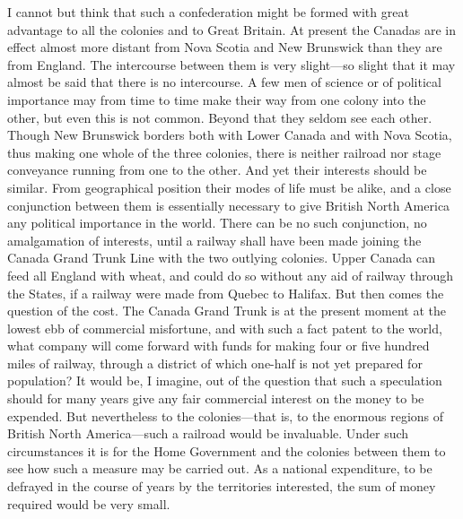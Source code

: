 I cannot but think that such a confederation might be formed with
great advantage to all the colonies and to Great Britain.  At
present the Canadas are in effect almost more distant from Nova
Scotia and New Brunswick than they are from England.  The
intercourse between them is very slight---so slight that it may
almost be said that there is no intercourse.  A few men of science
or of political importance may from time to time make their way
from one colony into the other, but even this is not common.
Beyond that they seldom see each other.  Though New Brunswick
borders both with Lower Canada and with Nova Scotia, thus making
one whole of the three colonies, there is neither railroad nor
stage conveyance running from one to the other.  And yet their
interests should be similar.  From geographical position their
modes of life must be alike, and a close conjunction between them
is essentially necessary to give British North America any
political importance in the world.  There can be no such
conjunction, no amalgamation of interests, until a railway shall
have been made joining the Canada Grand Trunk Line with the two
outlying colonies.  Upper Canada can feed all England with wheat,
and could do so without any aid of railway through the States, if a
railway were made from Quebec to Halifax.  But then comes the
question of the cost.  The Canada Grand Trunk is at the present
moment at the lowest ebb of commercial misfortune, and with such a
fact patent to the world, what company will come forward with funds
for making four or five hundred miles of railway, through a
district of which one-half is not yet prepared for population?  It
would be, I imagine, out of the question that such a speculation
should for many years give any fair commercial interest on the
money to be expended.  But nevertheless to the colonies---that is,
to the enormous regions of British North America---such a railroad
would be invaluable.  Under such circumstances it is for the Home
Government and the colonies between them to see how such a measure
may be carried out.  As a national expenditure, to be defrayed in
the course of years by the territories interested, the sum of money
required would be very small.

